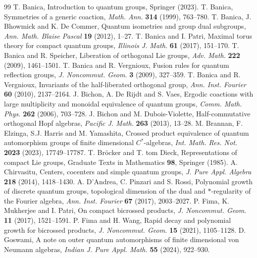\documentclass[11pt,a4paper]{article}
\theoremstyle{remark}
\begin{document}
\begin{thebibliography}{99}
\small\setlength{\itemsep}{0pt}\setlength{\parskip}{0pt}
 T. Banica, Introduction to quantum groups, Springer (2023).
 T. Banica, Symmetries of a generic coaction,
\emph{Math. Ann.} \textbf{314} (1999), 763--780.
 T. Banica, J. Bhowmick and K. De Commer, Quantum isometries and group dual subgroups, \emph{Ann. Math. Blaise Pascal} \textbf{19} (2012), 1--27.
 T. Banica and I. Patri, Maximal torus theory for compact quantum groups,
\emph{Illinois J. Math.} \textbf{61} (2017), 151--170.
 T. Banica and R. Speicher, Liberation of orthogonal Lie groups, \emph{Adv. Math.} \textbf{222} (2009), 1461--1501.
 T. Banica and R. Vergnioux, Fusion rules for quantum reflection groups, \emph{J. Noncommut. Geom.} \textbf{3} (2009), 327--359.
 T. Banica and R. Vergnioux, Invariants of the half-liberated orthogonal group, \emph{Ann. Inst. Fourier} \textbf{60} (2010), 2137--2164.
 J. Bichon, A. De Rijdt and S. Vaes, Ergodic coactions with large multiplicity and monoidal equivalence of quantum groups, \emph{Comm. Math. Phys.} \textbf{262} (2006), 703--728.
 J. Bichon and M. Dubois-Violette, Half-commutative orthogonal Hopf algebras, \emph{Pacific J. Math.} \textbf{263} (2013), 13--28.
 M. Brannan, F. Elzinga, S.J. Harris and M. Yamashita, Crossed product equivalence of quantum automorphism groups of finite dimensional $C^*$-algebras, \emph{Int. Math. Res. Not.} \textbf{2023} (2023), 17749--17787.
 T. Br\"ocker and T. tom Dieck, Representations of compact Lie groups, Graduate Texts in Mathematics \textbf{98}, Springer (1985).
 A. Chirvasitu, Centers, cocenters and simple quantum groups,
\emph{J. Pure Appl. Algebra} \textbf{218} (2014), 1418--1430.
 A. D'Andrea, C. Pinzari and S. Rossi, Polynomial growth of discrete quantum groups, topological dimension of the dual and $*$-regularity of the Fourier algebra, \emph{Ann. Inst. Fourier} \textbf{67} (2017), 2003--2027.
 P. Fima, K. Mukherjee and I. Patri, On compact bicrossed products,
\emph{J. Noncommut. Geom.} \textbf{11} (2017), 1521--1591.
 P. Fima and H. Wang, Rapid decay and polynomial growth for bicrossed products, \emph{J. Noncommut. Geom.} \textbf{15} (2021), 1105--1128.
 D. Goswami, A note on outer quantum automorphisms of finite dimensional von Neumann algebras, \emph{Indian J. Pure Appl. Math.} \textbf{55} (2024), 922--930.

\end{thebibliography}
\end{document}
